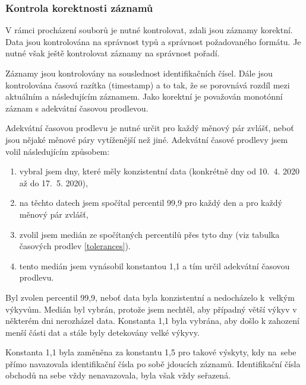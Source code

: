 \documentclass[thesis=B,czech]{FITthesis}[2019/03/21]
\begin{document}
\subsubsection{Kontrola korektnosti záznamů}
\label{section:kontrola_korektnosti_zaznamu}
V rámci procházení souborů je nutné kontrolovat, zdali jsou záznamy korektní. Data jsou kontrolována na správnost typů a správnost požadovaného formátu. Je nutné však ještě kontrolovat záznamy na správnost pořadí.

Záznamy jsou kontrolovány na souslednost identifikačních čísel. Dále jsou kontrolována časová razítka (timestamp) a to tak, že se porovnává rozdíl mezi aktuálním a následujícím záznamem. Jako korektní je považován monotónní záznam s adekvátní časovou prodlevou. 

Adekvátní časovou prodlevu je nutné určit pro každý měnový pár zvlášť, neboť jsou nějaké měnové páry vytíženější než jiné. Adekvátní časové prodlevy jsem volil následujícím způsobem:

\begin{enumerate}
    \item vybral jsem dny, které měly konzistentní data (konkrétně dny od 10.~4. 2020 až do 17.~5. 2020),
    \item na těchto datech jsem spočítal percentil 99,9 pro každý den a pro každý měnový pár zvlášť,
    \item zvolil jsem medián ze spočítaných percentilů přes tyto dny (viz tabulka časových prodlev \ref{tolerances}).
    \item tento medián jsem vynásobil konstantou 1,1 a tím určil adekvátní časovou prodlevu.
\end{enumerate}

Byl zvolen percentil 99,9, neboť data byla konzistentní a nedocházelo k~velkým výkyvům. Medián byl vybrán, protože jsem nechtěl, aby případný větší výkyv v některém dni nerozházel data. Konstanta 1,1 byla vybrána, aby došlo k zahození menší části dat a stále byly detekovány velké výkyvy.

Konstanta 1,1 byla zaměněna za konstantu 1,5 pro takové výskyty, kdy na~sebe přímo navazovala identifikační čísla po sobě jdoucích záznamů. Identifikační čísla obchodů na sebe vždy nenavazovala, byla však vždy seřazená. 
\end{document}
